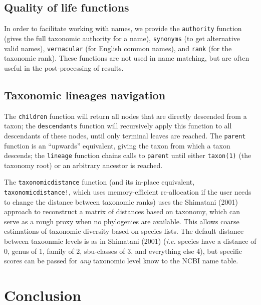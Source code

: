 \documentclass[10pt,oneside]{article}
\begin{document}
\hypertarget{quality-of-life-functions}{%
\subsection{Quality of life functions}\label{quality-of-life-functions}}

In order to facilitate working with names, we provide the
\texttt{authority} function (gives the full taxonomic authority for a
name), \texttt{synonyms} (to get alternative valid names),
\texttt{vernacular} (for English common names), and \texttt{rank} (for
the taxonomic rank). These functions are not used in name matching, but
are often useful in the post-processing of results.

\hypertarget{taxonomic-lineages-navigation}{%
\subsection{Taxonomic lineages
navigation}\label{taxonomic-lineages-navigation}}

The \texttt{children} function will return all nodes that are directly
descended from a taxon; the \texttt{descendants} function will
recursively apply this function to all descendants of these nodes, until
only terminal leaves are reached. The \texttt{parent} function is an
``upwards'' equivalent, giving the taxon from which a taxon descends;
the \texttt{lineage} function chains calls to \texttt{parent} until
either \texttt{taxon(1)} (the taxonomy root) or an arbitrary ancestor is
reached.

The \texttt{taxonomicdistance} function (and its in-place equivalent,
\texttt{taxonomicdistance!}, which uses memory-efficient re-allocation
if the user needs to change the distance between taxonomic ranks) uses
the Shimatani (2001) approach to reconstruct a matrix of distances based
on taxonomy, which can serve as a rough proxy when no phylogenies are
available. This allows coarse estimations of taxonomic diversity based
on species lists. The default distance between taxoonmic levels is as in
Shimatani (2001) (\emph{i.e.} species have a distance of 0, genus of 1,
family of 2, sbu-classes of 3, and everything else 4), but specific
scores can be passed for \emph{any} taxonomic level know to the NCBI
name table.

\hypertarget{conclusion}{%
\section{Conclusion}\label{conclusion}}
\end{document}
